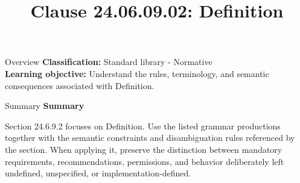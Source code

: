 \documentclass[10pt,letterpaper]{article}
\title{Clause 24.06.09.02: Definition}
\author{}
\date{}
\begin{document}
\maketitle
\begin{CornellOverviewBox}{Overview}
\textbf{Classification:} Standard library - Normative\\[2pt]
\textbf{Learning objective:} Understand the rules, terminology, and semantic consequences associated with Definition.
\end{CornellOverviewBox}\begin{CornellSummaryBox}{Summary}
{\sffamily\bfseries\color{Accent} Summary}\par\vspace{3pt}Section 24.6.9.2 focuses on Definition. Use the listed grammar productions together with the semantic constraints and disambiguation rules referenced by the section. When applying it, preserve the distinction between mandatory requirements, recommendations, permissions, and behavior deliberately left undefined, unspecified, or implementation-defined.
\end{CornellSummaryBox}
\end{document}
